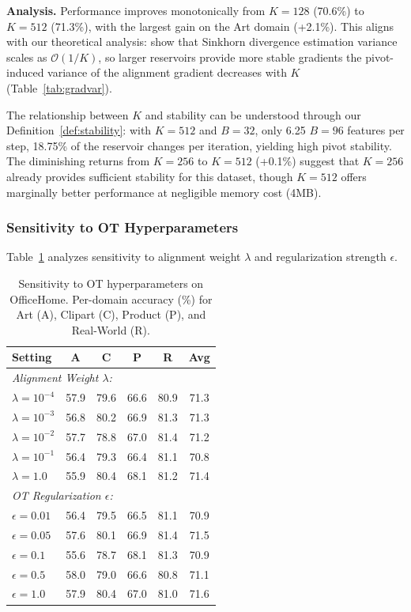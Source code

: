\documentclass[preprint,12pt]{elsarticle}
\providecommand{\DIFadd}[1]{{\protect\color{blue} \sf #1}} %
\providecommand{\DIFdel}[1]{{\protect\color{red} \scriptsize #1}} %
\providecommand{\DIFaddbegin}{} %
\providecommand{\DIFaddend}{} %
\providecommand{\DIFdelbegin}{} %
\providecommand{\DIFdelend}{} %
\newcommand{\DIFscaledelfig}{0.5}
\newlength{\DIFdelgraphicswidth} %
\newlength{\DIFdelgraphicsheight} %
\newcommand{\DIFaddincludegraphics}[2][]{{\color{blue}\fbox{\DIFOincludegraphics[#1]{#2}}}} %
\newcommand{\DIFdelincludegraphics}[2][]{%
\sbox{\DIFdelgraphicsbox}{\DIFOincludegraphics[#1]{#2}}%
\settoboxwidth{\DIFdelgraphicswidth}{\DIFdelgraphicsbox} %
\settoboxtotalheight{\DIFdelgraphicsheight}{\DIFdelgraphicsbox} %
\scalebox{\DIFscaledelfig}{%
\parbox[b]{\DIFdelgraphicswidth}{\usebox{\DIFdelgraphicsbox}\\[-\baselineskip] \rule{\DIFdelgraphicswidth}{0em}}\llap{\resizebox{\DIFdelgraphicswidth}{\DIFdelgraphicsheight}{%
\setlength{\unitlength}{\DIFdelgraphicswidth}%
\begin{picture}(1,1)%
\thicklines\linethickness{2pt} %
{\color[rgb]{1,0,0}\put(0,0){\framebox(1,1){}}}%
{\color[rgb]{1,0,0}\put(0,0){\line( 1,1){1}}}%
{\color[rgb]{1,0,0}\put(0,1){\line(1,-1){1}}}%
\end{picture}%
}\hspace*{3pt}}} %
} %
\DeclareRobustCommand{\DIFaddbegin}{\DIFOaddbegin \let\includegraphics\DIFaddincludegraphics} %
\DeclareRobustCommand{\DIFaddend}{\DIFOaddend \let\includegraphics\DIFOincludegraphics} %
\DeclareRobustCommand{\DIFdelbegin}{\DIFOdelbegin \let\includegraphics\DIFdelincludegraphics} %
\DeclareRobustCommand{\DIFdelend}{\DIFOaddend \let\includegraphics\DIFOincludegraphics} %
\begin{document}
\textbf{Analysis.} Performance improves monotonically from $K=128$ (70.6\%) to $K=512$ (71.3\%), with the largest gain on the Art domain (+2.1\%). This aligns with our theoretical analysis: \DIFdelbegin \DIFdel{\citet{genevay2019sample} show that Sinkhorn divergence estimation variance scales as $\mathcal{O}(1/K)$, so larger reservoirs provide more stable gradients}\DIFdelend \DIFaddbegin \DIFadd{the pivot-induced variance of the alignment gradient decreases with $K$ (Table~\ref{tab:gradvar})}\DIFaddend .

The relationship between $K$ and stability can be understood through our Definition~\ref{def:stability}: with $K=512$ and \DIFdelbegin \DIFdel{$B=32$, only 6.25}\DIFdelend \DIFaddbegin \DIFadd{$B=96$ features per step, 18.75}\DIFaddend \% of the reservoir changes per iteration, yielding high pivot stability. The diminishing returns from $K=256$ to $K=512$ (+0.1\%) suggest that $K=256$ already provides sufficient stability for this dataset, though $K=512$ offers marginally better performance at negligible memory cost (4MB).

\subsubsection{Sensitivity to OT Hyperparameters}

Table~\ref{tab:ablation_ot} analyzes sensitivity to alignment weight $\lambda$ and regularization strength $\epsilon$.

\begin{table}[t]
\caption{Sensitivity to OT hyperparameters on OfficeHome. Per-domain accuracy (\%) for Art (A), Clipart (C), Product (P), and Real-World (R).}
\label{tab:ablation_ot}
\centering
\small
\renewcommand{\arraystretch}{1.1}
\begin{tabular}{lcccc|c}
\toprule
\textbf{Setting} & \textbf{A} & \textbf{C} & \textbf{P} & \textbf{R} & \textbf{Avg} \\
\midrule
\multicolumn{6}{l}{\textit{Alignment Weight $\lambda$:}} \\
$\lambda = 10^{-4}$ & 57.9 & 79.6 & 66.6 & 80.9 & 71.3 \\
$\lambda = 10^{-3}$ & 56.8 & 80.2 & 66.9 & 81.3 & 71.3 \\
$\lambda = 10^{-2}$ & 57.7 & 78.8 & 67.0 & 81.4 & 71.2 \\
$\lambda = 10^{-1}$ & 56.4 & 79.3 & 66.4 & 81.1 & 70.8 \\
$\lambda = 1.0$ & 55.9 & 80.4 & 68.1 & 81.2 & 71.4 \\
\midrule
\multicolumn{6}{l}{\textit{OT Regularization $\epsilon$:}} \\
$\epsilon = 0.01$ & 56.4 & 79.5 & 66.5 & 81.1 & 70.9 \\
$\epsilon = 0.05$ & 57.6 & 80.1 & 66.9 & 81.4 & 71.5 \\
$\epsilon = 0.1$ & 55.6 & 78.7 & 68.1 & 81.3 & 70.9 \\
$\epsilon = 0.5$ & 58.0 & 79.0 & 66.6 & 80.8 & 71.1 \\
$\epsilon = 1.0$ & 57.9 & 80.4 & 67.0 & 81.0 & 71.6 \\
\bottomrule
\end{tabular}
\end{table}
\end{document}
